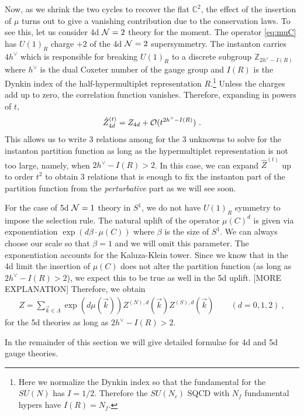 \documentclass[letterpaper, 11pt]{article}
\def\IC{\mathbb{C}}
\def\IZ{\mathbb{Z}}
\def\CN{{\cal N}}
\def\CO{{\cal O}}
\begin{document}
Now, as we shrink the two cycles to recover the flat $\IC^2$, the effect of the insertion of $\mu$ turns out to give a vanishing contribution due to the conservation laws. 
To see this, let us consider 4d $\CN=2$ theory for the moment. The operator \eqref{eq:muC} has $U(1)_R$ charge $+2$ of the 4d $\CN=2$ supersymmetry. The instanton carries $4h^\vee$ which is responsible for breaking $U(1)_R$ to a discrete subgroup $\IZ_{2h^\vee - I(R)}$ where $h^\vee$ is the dual Coxeter number of the gauge group and $I(R)$ is the Dynkin index of the half-hypermultiplet representation $R$.\footnote{Here we normalize the Dynkin index so that the fundamental for the $SU(N)$ has $I=1/2$. Therefore the $SU(N_c)$ SQCD with $N_f$ fundamental hypers have $I(R) = N_f$.} Unless the charges add up to zero, the correlation function vanishes. Therefore, expanding in powers of $t$, 
\begin{align}
\hat{Z}_{4d}^{(t)} = Z_{4d} + \CO(t^{2h^\vee - I(R)})  \ . 
\end{align}
This allows us to write 3 relations among for the 3 unknowns to solve for the instanton partition function as long as the hypermultiplet representation is not too large, namely, when $2h^\vee - I(R) > 2$. In this case, we can expand $\hat{Z}^{(t)}$ up to order $t^2$ to obtain 3 relations that is enough to fix the instanton part of the partition function from the \emph{perturbative} part as we will see soon. 

For the case of 5d $\CN=1$ theory in $S^1$, we do not have $U(1)_R$ symmetry to impose the selection rule. The natural uplift of the operator $\mu(C)^d$ is given via exponentiation $\exp\left( d \beta \cdot \mu (C) \right)$ where $\beta$ is the size of $S^1$. We can always choose our scale so that $\beta = 1$ and we will omit this parameter. The exponentiation accounts for the Kaluza-Klein tower. Since we know that in the 4d limit the insertion of $\mu(C)$ does not alter the partition function (as long as $2h^\vee - I(R)>2$), we expect this to be true as well in the 5d uplift. 
[MORE EXPLANATION] 
Therefore, we obtain
\begin{align}
 Z = \sum_{\vec{k} \in \Lambda} \exp\left( d \mu(\vec{k}) \right) Z^{(N), d}(\vec{k})  Z^{(S), d}(\vec{k})  \qquad (d=0, 1, 2) \ , 
\end{align} 
for the 5d theories as long as $2h^\vee - I(R) > 2$.

In the remainder of this section we will give detailed formulae for 4d and 5d gauge theories. 
\end{document}
